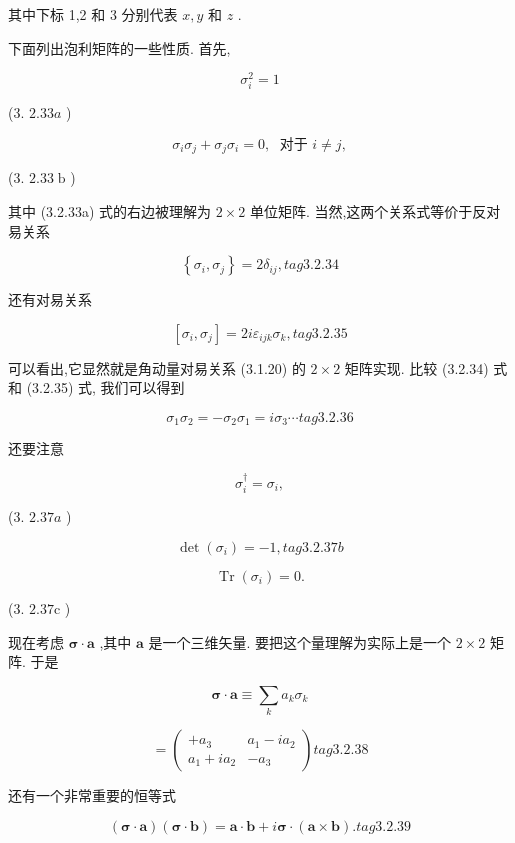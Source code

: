 其中下标 1,2 和 3 分别代表 $x, y$ 和 $z$ .

下面列出泡利矩阵的一些性质. 首先,

$$
{\sigma }_{i}^{2} = 1
$$

(3. ${2.33a}$ )

$$
{\sigma }_{i}{\sigma }_{j} + {\sigma }_{j}{\sigma }_{i} = 0,\;\text{ 对于 }i \neq j,
$$

(3. ${2.33}\mathrm{\;b}$ )

其中 (3.2.33a) 式的右边被理解为 $2 \times 2$ 单位矩阵. 当然,这两个关系式等价于反对易关系

$$
\left\{ {{\sigma }_{i},{\sigma }_{j}}\right\} = 2{\delta }_{ij}, tag{3. 2.34}
$$

还有对易关系

$$
\left\lbrack {{\sigma }_{i},{\sigma }_{j}}\right\rbrack = {2i}{\varepsilon }_{ijk}{\sigma }_{k}, tag{3. 2.35}
$$

可以看出,它显然就是角动量对易关系 (3.1.20) 的 $2 \times 2$ 矩阵实现. 比较 (3.2.34) 式和 (3.2.35) 式, 我们可以得到

$$
{\sigma }_{1}{\sigma }_{2} = - {\sigma }_{2}{\sigma }_{1} = i{\sigma }_{3}\cdots tag{3. 2.36}
$$

还要注意

$$
{\sigma }_{i}^{ \dagger } = {\sigma }_{i},
$$

(3. ${2.37a}$ )

$$
\det \left( {\sigma }_{i}\right) = - 1, tag{3. 2.37b}
$$

$$
\operatorname{Tr}\left( {\sigma }_{i}\right) = 0.
$$

(3. ${2.37}\mathrm{c}$ )

现在考虑 $\mathbf{\sigma } \cdot \mathbf{a}$ ,其中 $\mathbf{a}$ 是一个三维矢量. 要把这个量理解为实际上是一个 $2 \times 2$ 矩阵. 于是

$$
\mathbf{\sigma } \cdot \mathbf{a} \equiv \mathop{\sum }\limits_{k}{a}_{k}{\sigma }_{k}
$$

$$
= \left( \begin{matrix} + {a}_{3} & {a}_{1} - i{a}_{2} \\ {a}_{1} + i{a}_{2} & - {a}_{3} \end{matrix}\right) tag{3. 2.38}
$$

还有一个非常重要的恒等式

$$
\left( {\mathbf{\sigma } \cdot \mathbf{a}}\right) \left( {\mathbf{\sigma } \cdot \mathbf{b}}\right) = \mathbf{a} \cdot \mathbf{b} + i\mathbf{\sigma } \cdot \left( {\mathbf{a} \times \mathbf{b}}\right) . tag{3. 2.39}
$$

